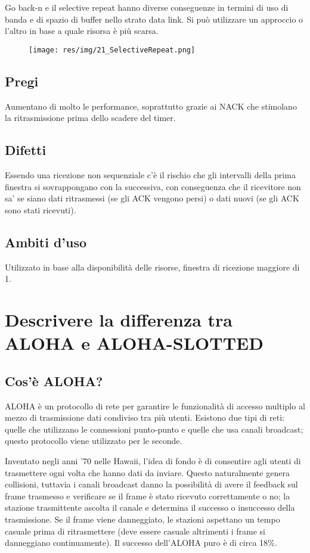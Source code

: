 Go back-n e il selective repeat hanno diverse conseguenze in termini di uso di banda e di spazio di buffer nello strato data link.
Si può utilizzare un approccio o l'altro in base a quale risorsa è più scarsa.

\begin{figure}[H]
\centering
\texttt{[image: res/img/21\_SelectiveRepeat.png]}
\end{figure}
 
\subsection{Pregi}
Aumentano di molto le performance, soprattutto grazie ai NACK che stimolano la ritrasmissione prima dello scadere del timer.

\subsection{Difetti}
Essendo una ricezione non sequenziale c'è il rischio che gli intervalli della prima finestra si sovrappongano con la successiva, con conseguenza che il ricevitore non sa' se siano dati ritrasmessi (se gli ACK vengono persi) o dati nuovi (se gli ACK sono stati ricevuti).

\subsection{Ambiti d'uso}
Utilizzato in base alla disponibilità delle risorse, finestra di ricezione maggiore di 1.

\section{Descrivere la differenza tra ALOHA e ALOHA-SLOTTED}
\subsection{Cos'è ALOHA?}
ALOHA è un protocollo di rete per garantire le funzionalità di accesso multiplo al mezzo di trasmissione dati condiviso tra più utenti.
Esistono due tipi di reti: quelle che utilizzano le connessioni punto-punto e quelle che usa canali broadcast;
questo protocollo viene utilizzato per le seconde.

Inventato negli anni '70 nelle Hawaii, l'idea di fondo è di consentire agli utenti di trasmettere ogni volta che hanno dati da inviare.
Questo naturalmente genera collisioni, tuttavia i canali broadcast danno la possibilità di avere il feedback sul frame trasmesso e  verificare se il frame è stato ricevuto correttamente o no;
la stazione trasmittente ascolta il canale e determina il successo o insuccesso della trasmissione.
Se il frame viene danneggiato, le stazioni aspettano un tempo casuale prima di ritrasmettere (deve essere casuale altrimenti i frame si danneggiano continuamente).
Il successo dell'ALOHA puro è di circa 18\%.


